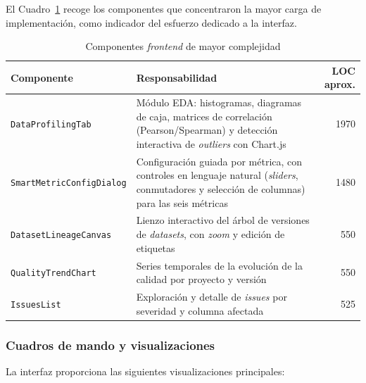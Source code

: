 El Cuadro~\ref{tab:componentes-frontend} recoge los componentes que
concentraron la mayor carga de implementación, como indicador del esfuerzo
dedicado a la interfaz.

\begin{table}[htbp]
  \centering
  \small
  \caption{Componentes \emph{frontend} de mayor complejidad}
  \label{tab:componentes-frontend}
  \begin{tabularx}{\textwidth}{l X r}
    \toprule
    \textbf{Componente} & \textbf{Responsabilidad} & \textbf{LOC aprox.} \\
    \midrule
    \texttt{DataProfilingTab} & Módulo \ac{EDA}: histogramas, diagramas de caja,
      matrices de correlación (Pearson/Spearman) y detección interactiva de
      \emph{outliers} con Chart.js & 1970 \\
    \texttt{SmartMetricConfigDialog} & Configuración guiada por métrica, con
      controles en lenguaje natural (\emph{sliders}, conmutadores y selección de
      columnas) para las seis métricas & 1480 \\
    \texttt{DatasetLineageCanvas} & Lienzo interactivo del árbol de versiones de
      \emph{datasets}, con \emph{zoom} y edición de etiquetas & 550 \\
    \texttt{QualityTrendChart} & Series temporales de la evolución de la calidad
      por proyecto y versión & 550 \\
    \texttt{IssuesList} & Exploración y detalle de \emph{issues} por severidad y
      columna afectada & 525 \\
    \bottomrule
  \end{tabularx}
\end{table}

\subsubsection{Cuadros de mando y visualizaciones}

La interfaz proporciona las siguientes visualizaciones principales:

